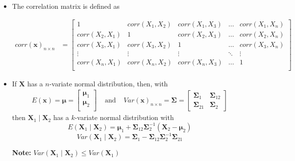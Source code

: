 \documentclass[10pt, twoside, a4paper]{book}
\theoremstyle{definition}
\begin{document}
\begin{itemize}
\item The correlation matrix is defined as

\begin{equation*}
\renewcommand{\arraystretch}{1.6}
\begin{array}{ll}

corr(\bm x)_{n \times n} & = 
\begin{bmatrix}
1 & corr(X_1, X_2) & corr(X_1, X_3) & \hdots & corr(X_1, X_n) \\
corr(X_2, X_1) & 1 & corr(X_2, X_3) & \hdots & corr(X_2, X_n) \\
corr(X_3, X_1) & corr(X_3, X_2) & 1 & \hdots & corr(X_3, X_n) \\
\vdots & \vdots & \vdots & \ddots  & \vdots \\
corr(X_n, X_1) & corr(X_n, X_2) & corr(X_n, X_3) & \hdots & 1 \\
\end{bmatrix}
\end{array}
\end{equation*}

\item If $\bm X$ has a $n$-variate normal distribution, then, with
\begin{equation*}
\renewcommand{\arraystretch}{1.6}
\begin{array}{lll}

E(\bm x) = 
\bm \mu =
\begin{bmatrix}
\bm \mu_1 \\ \bm \mu_2 \\
\end{bmatrix}

 & \text{ and } & 
 
 Var(\bm x)_{n \times n} = 
\bm \Sigma =
\begin{bmatrix}
\bm \Sigma_1 & \bm \Sigma_{12} \\
\bm \Sigma_{21} & \bm \Sigma_2
\end{bmatrix}

\end{array}
\end{equation*}
then $\bm X_1 \mid \bm X_2$ has a $k$-variate normal distribution with
$$E(\bm X_1 \mid \bm X_2) = \bm \mu_1 + \bm \Sigma_{12} \bm
\Sigma_2^{-1}(\bm X_2 - \bm \mu_2)$$
$$Var(\bm X_1 \mid \bm X_2) = \bm \Sigma_1 - \bm \Sigma_{12} \bm \Sigma_2^{-1}
\bm \Sigma_{21}$$
\item[\bf{Note:}] $Var(\bm X_1 \mid \bm X_2) \leq Var(\bm X_1)$

\end{itemize}
	
\end{document}
